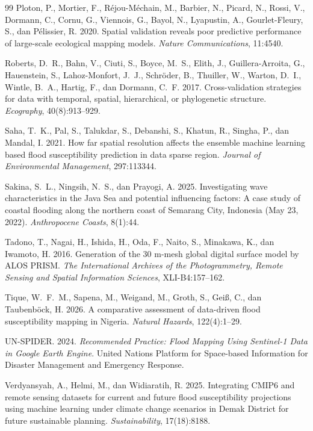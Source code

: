\documentclass[12pt,a4paper]{article}
\begin{document}
\begin{thebibliography}{99}
 Ploton, P., Mortier, F., R{\'e}jou-M{\'e}chain, M., Barbier, N., Picard, N., Rossi, V., Dormann, C., Cornu, G., Viennois, G., Bayol, N., Lyapustin, A., Gourlet-Fleury, S., dan P{\'e}lissier, R. 2020. Spatial validation reveals poor predictive performance of large-scale ecological mapping models. \textit{Nature Communications}, 11:4540.

 Roberts, D.~R., Bahn, V., Ciuti, S., Boyce, M.~S., Elith, J., Guillera-Arroita, G., Hauenstein, S., Lahoz-Monfort, J.~J., Schröder, B., Thuiller, W., Warton, D.~I., Wintle, B.~A., Hartig, F., dan Dormann, C.~F. 2017. Cross-validation strategies for data with temporal, spatial, hierarchical, or phylogenetic structure. \textit{Ecography}, 40(8):913--929.

 Saha, T.~K., Pal, S., Talukdar, S., Debanshi, S., Khatun, R., Singha, P., dan Mandal, I. 2021. How far spatial resolution affects the ensemble machine learning based flood susceptibility prediction in data sparse region. \textit{Journal of Environmental Management}, 297:113344.

 Sakina, S.~L., Ningsih, N.~S., dan Prayogi, A. 2025. Investigating wave characteristics in the Java Sea and potential influencing factors: A case study of coastal flooding along the northern coast of Semarang City, Indonesia (May 23, 2022). \textit{Anthropocene Coasts}, 8(1):44.

 Tadono, T., Nagai, H., Ishida, H., Oda, F., Naito, S., Minakawa, K., dan Iwamoto, H. 2016. Generation of the 30 m-mesh global digital surface model by ALOS PRISM. \textit{The International Archives of the Photogrammetry, Remote Sensing and Spatial Information Sciences}, XLI-B4:157--162.

 Tique, W.~F.~M., Sapena, M., Weigand, M., Groth, S., Gei{\ss}, C., dan Taubenb{\"o}ck, H. 2026. A comparative assessment of data-driven flood susceptibility mapping in Nigeria. \textit{Natural Hazards}, 122(4):1--29.

 UN-SPIDER. 2024. \textit{Recommended Practice: Flood Mapping Using Sentinel-1 Data in Google Earth Engine}. United Nations Platform for Space-based Information for Disaster Management and Emergency Response.

 Verdyansyah, A., Helmi, M., dan Widiaratih, R. 2025. Integrating CMIP6 and remote sensing datasets for current and future flood susceptibility projections using machine learning under climate change scenarios in Demak District for future sustainable planning. \textit{Sustainability}, 17(18):8188.


\end{thebibliography}
\end{document}
